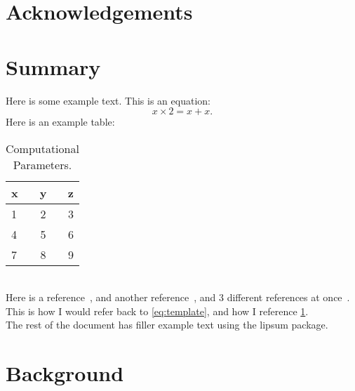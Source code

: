\documentclass[12pt, letterpaper, oneside]{article}  %
\begin{document}
\clearpage \doublespacing \pagestyle{plain}
\section*{Acknowledgements} %
\lipsum[39]
\newpage%


\section*{Summary}
Here is some example text.
This is an equation:
\begin{equation}\label{eq:template}
    x \times 2 = x + x.
\end{equation}
Here is an example table:
\begin{table}[h!]
    \centering
    \begin{tabular}{ l c r }
        \toprule
        x & y & z \\
        \midrule
        1 & 2 & 3 \\
        4 & 5 & 6 \\
        7 & 8 & 9 \\
    \end{tabular}
    \caption{\label{table:one} Computational Parameters.}
\end{table}\\
Here is a reference~\cite{goodfellow1990molecular}, and another reference~\cite{schmidt2014inclusion}, and 3 different references at once~\cite{sarsa2000path,constable2013langevin,goodfellow1990molecular}.
This is how I would refer back to \cref{eq:template}, and how I reference \cref{table:one}.\\
The rest of the document has filler example text using the lipsum package.
\newpage

\section{Background}
\end{document}
